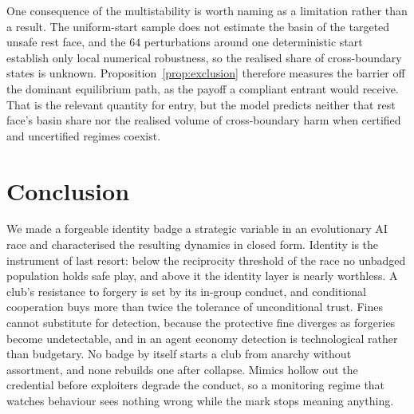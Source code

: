 \documentclass[preprint,12pt]{elsarticle}
\theoremstyle{plain}
\theoremstyle{definition}
\begin{document}
One consequence of the multistability is worth naming as a limitation rather
than a result. The uniform-start sample does not estimate the basin of the
targeted unsafe rest face, and the $64$ perturbations around one deterministic
start establish only local numerical robustness, so the realised share of
cross-boundary states is unknown. Proposition~\ref{prop:exclusion} therefore measures the barrier off
the dominant equilibrium path, as the payoff a compliant entrant would
receive. That is the relevant quantity for entry, but the model predicts
neither that rest face's basin share nor the realised volume of
cross-boundary harm when certified and uncertified regimes coexist.

\section{Conclusion}
\label{sec:conclusion}

We made a forgeable identity badge a strategic variable in an evolutionary AI
race and characterised the resulting dynamics in closed form. Identity is the
instrument of last resort: below the reciprocity threshold of the race no
unbadged population holds safe play, and above it the identity layer is nearly
worthless. A club's resistance to forgery is set by its in-group conduct, and
conditional cooperation buys more than twice the tolerance of unconditional
trust. Fines cannot substitute for detection, because the protective fine
diverges as forgeries become undetectable, and in an agent economy detection is
technological rather than budgetary. No badge by itself starts a club from
anarchy without assortment,
and none rebuilds one after collapse. Mimics hollow out the credential before
exploiters degrade the conduct, so a monitoring regime that watches behaviour
sees nothing wrong while the mark stops meaning anything.
\end{document}
